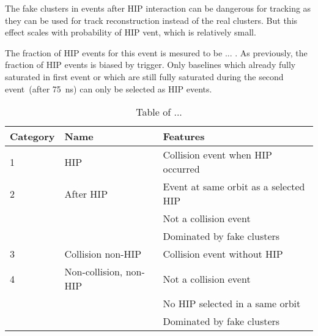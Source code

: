 The fake clusters in events after HIP interaction can be dangerous for tracking as they can be used for track reconstruction instead of the real clusters. But this effect scales with probability of HIP vent, which is relatively small.

The fraction of HIP events for this event is mesured to be ... . As previously, the fraction of HIP events is biased by trigger. Only baselines which already fully saturated in first event or which are still fully saturated during the second event~(after 75~ns) can only be selected as HIP events.



\begin{table}[h]
\begin{center}
\begin{tabular}{|l|l|l|}
\hline
Category & Name  & Features \\
\hline
1 & HIP & Collision event when HIP occurred \\
\hline
2 & After HIP & Event at same orbit as a selected HIP \\
& & Not a collision event \\
& & Dominated by fake clusters \\
\hline
3 & Collision non-HIP & Collision event without HIP \\
\hline
4 & Non-collision, non-HIP  & Not a collision event \\
& & No HIP selected in a same orbit \\
& & Dominated by fake clusters \\
\hline
\end{tabular}
\caption[Table caption text]{Table of ... }
\label{tab:eventCategories}
\end{center}
\end{table}


\begin{table}
\begin{center}
\caption[Table caption text]{Table of ... }
\label{tab:clusterCategories}
\end{center}
\end{table}


